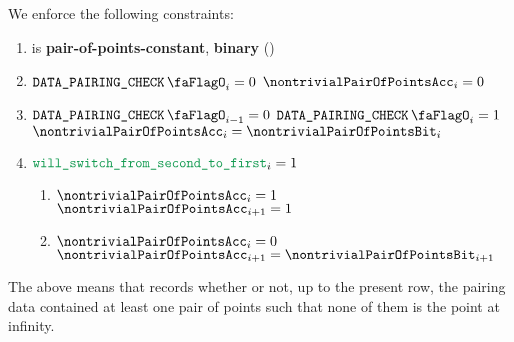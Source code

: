 
We enforce the following constraints:
\begin{enumerate}
    \item \nontrivialPairOfPointsAcc{} is \textbf{pair-of-points-constant}, \textbf{binary} \quad (\trash)
    \item \If $\isBlsPairingCheckData _{i} = 0$ \Then $\nontrivialPairOfPointsAcc _{i} = 0$
    \item \If $\isBlsPairingCheckData _{i - 1} = 0$ \et $\isBlsPairingCheckData _{i} = 1$ \Then $\nontrivialPairOfPointsAcc _{i} = \nontrivialPairOfPointsBit _{i}$
    \item
        \label{bls: setting trivial: transition from large to small}
        \If $\locWillSwitchFromSecondToFirst _{i} = 1$ \Then
          \begin{enumerate}
              \item \If $\nontrivialPairOfPointsAcc _{i} = 1$ \Then $\nontrivialPairOfPointsAcc _{i + 1} = 1$
              \item \If $\nontrivialPairOfPointsAcc _{i} = 0$ \Then $\nontrivialPairOfPointsAcc _{i + 1} = \nontrivialPairOfPointsBit _{i + 1}$
          \end{enumerate}
\end{enumerate}
\saNote{} The above means that \nontrivialPairOfPointsAcc{} records whether or not, up to the present row, the pairing data contained at least one pair of points such that none of them is the point at infinity.